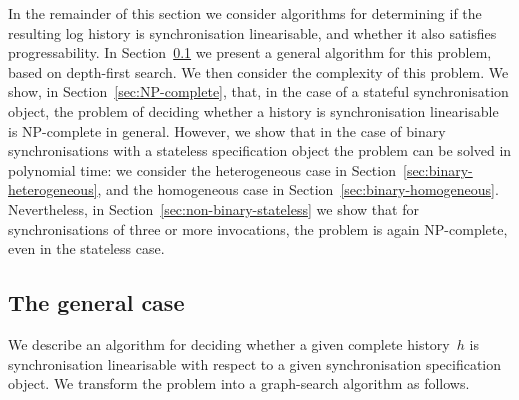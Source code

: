 In the remainder of this section we consider algorithms for determining if the
resulting log history is synchronisation linearisable, and whether it also
satisfies progressability.  In Section~\ref{sec:algorithm-dfs} we present a
general algorithm for this problem, based on depth-first search.  We then
consider the complexity of this problem.  We show, in
Section~\ref{sec:NP-complete}, that, in the case of a stateful synchronisation
object, the problem of deciding whether a history is synchronisation
linearisable is NP-complete in general.  However, we show that in the case of
binary synchronisations with a stateless specification object the problem can
be solved in polynomial time: we consider the heterogeneous case in
Section~\ref{sec:binary-heterogeneous}, and the homogeneous case in
Section~\ref{sec:binary-homogeneous}.  Nevertheless, in
Section~\ref{sec:non-binary-stateless} we show that for synchronisations of
three or more invocations, the problem is again NP-complete, even in the
stateless case.





\subsection{The general case}
\label{sec:algorithm-dfs}

We describe an algorithm for deciding whether a given complete history~$h$ is
synchronisation linearisable with respect to a given synchronisation
specification object.  We transform the problem into a graph-search algorithm
as follows.

